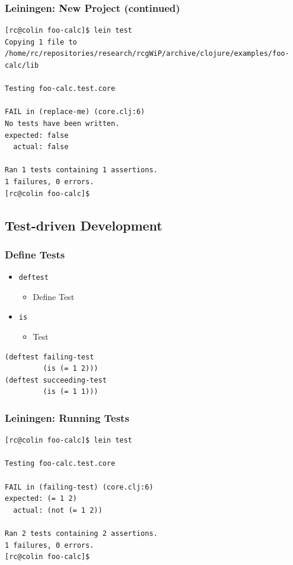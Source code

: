 \documentclass{beamer}
\begin{document}
\begin{frame}[fragile]
\frametitle{Leiningen: New Project (continued)}
\begin{lstlisting}[basicstyle=\scriptsize]
[rc@colin foo-calc]$ lein test 
Copying 1 file to /home/rc/repositories/research/rcgWiP/archive/clojure/examples/foo-calc/lib
 
Testing foo-calc.test.core
 
FAIL in (replace-me) (core.clj:6)
No tests have been written.
expected: false
  actual: false

Ran 1 tests containing 1 assertions.
1 failures, 0 errors.
[rc@colin foo-calc]$  
\end{lstlisting}
\end{frame}

  \subsection{Test-driven Development}

\begin{frame}[fragile]
\frametitle{Define Tests}
\begin{itemize}
\item \texttt{deftest}
\begin{itemize}
\item Define Test
\end{itemize}
\item \texttt{is}
\begin{itemize}
\item Test
\end{itemize}
\end{itemize}
\begin{lstlisting}[basicstyle=\scriptsize]
(deftest failing-test
         (is (= 1 2)))
(deftest succeeding-test
         (is (= 1 1)))
\end{lstlisting}
\end{frame}

\begin{frame}[fragile]
\frametitle{Leiningen: Running Tests}
\begin{lstlisting}[basicstyle=\scriptsize]
[rc@colin foo-calc]$ lein test 
 
Testing foo-calc.test.core
 
FAIL in (failing-test) (core.clj:6)
expected: (= 1 2)
  actual: (not (= 1 2))

Ran 2 tests containing 2 assertions.
1 failures, 0 errors.
[rc@colin foo-calc]$  
\end{lstlisting}
\end{frame}
\end{document}
